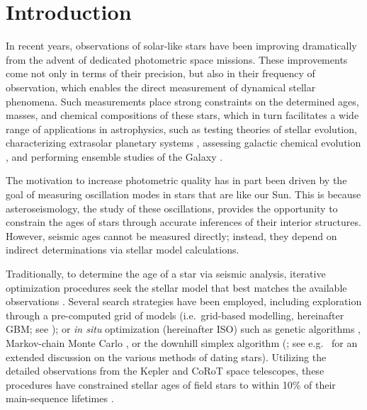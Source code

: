 \documentclass[twocolumn,twocolappendix]{aastex6}
\begin{document}


\section{Introduction}
In recent years, observations of solar-like stars have been improving dramatically from the advent of dedicated photometric space missions. These improvements come not only in terms of their precision, but also in their frequency of observation, which enables the direct measurement of dynamical stellar phenomena. Such measurements place strong constraints on the determined ages, masses, and chemical compositions of these stars, which in turn facilitates a wide range of applications in astrophysics, such as testing theories of stellar evolution, characterizing extrasolar planetary systems \citep[e.g.][]{2015ApJ...799..170C,2015MNRAS.452.2127S}, assessing galactic chemical evolution \citep[e.g.][]{2015ASSP...39..111C}, and performing ensemble studies of the Galaxy \citep[e.g.][]{2011Sci...332..213C, 2013MNRAS.429..423M, 2014ApJS..210....1C}. 

The motivation to increase photometric quality has in part been driven by the goal of measuring oscillation modes in stars that are like our Sun. This is because asteroseismology, the study of these oscillations, provides the opportunity to constrain the ages of stars through accurate inferences of their interior structures. However, seismic ages cannot be measured directly; instead, they depend on indirect determinations via stellar model calculations. 

Traditionally, to determine the age of a star via seismic analysis, iterative optimization procedures seek the stellar model that best matches the available observations \citep{1994ApJ...427.1013B}. 
Several search strategies have been employed, including exploration through a pre-computed grid of models (i.e.\ grid-based modelling, hereinafter GBM; see \citealt{2011ApJ...730...63G, 2014ApJS..210....1C}); or \emph{in situ} optimization (hereinafter ISO) such as genetic algorithms \citep{2014ApJS..214...27M}, Markov-chain Monte Carlo \citep{2012MNRAS.427.1847B}, or the downhill simplex algorithm (\citealt{2013ApJS..208....4P}; see e.g.\ \citealt{2015MNRAS.452.2127S} for an extended discussion on the various methods of dating stars). Utilizing the detailed observations from the Kepler and CoRoT space telescopes, these procedures have constrained stellar ages of field stars to within 10\% of their main-sequence lifetimes \citep{2015MNRAS.452.2127S}. 
\end{document}

